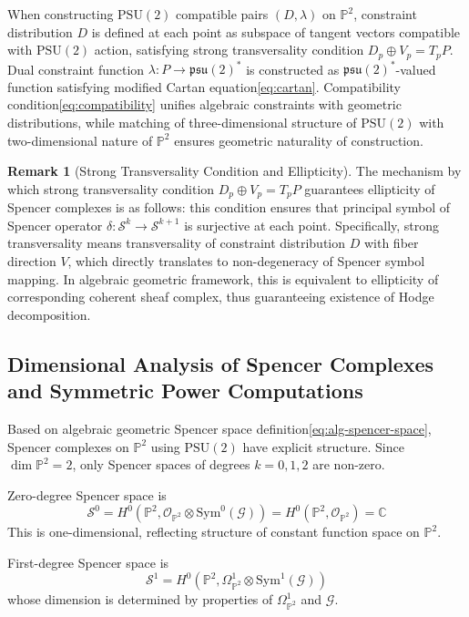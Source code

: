 \documentclass[a4paper,12pt]{extarticle}
\theoremstyle{definition}
\newtheorem{remark}{Remark}
\begin{document}
When constructing $\text{PSU}(2)$ compatible pairs $(D,\lambda)$ on $\mathbb{P}^2$, constraint distribution $D$ is defined at each point as subspace of tangent vectors compatible with $\text{PSU}(2)$ action, satisfying strong transversality condition $D_p \oplus V_p = T_pP$. Dual constraint function $\lambda: P \to \mathfrak{psu}(2)^*$ is constructed as $\mathfrak{psu}(2)^*$-valued function satisfying modified Cartan equation\eqref{eq:cartan}. Compatibility condition\eqref{eq:compatibility} unifies algebraic constraints with geometric distributions, while matching of three-dimensional structure of $\text{PSU}(2)$ with two-dimensional nature of $\mathbb{P}^2$ ensures geometric naturality of construction.

\begin{remark}[Strong Transversality Condition and Ellipticity]
The mechanism by which strong transversality condition $D_p \oplus V_p = T_pP$ guarantees ellipticity of Spencer complexes is as follows: this condition ensures that principal symbol of Spencer operator $\delta: \mathcal{S}^k \to \mathcal{S}^{k+1}$ is surjective at each point. Specifically, strong transversality means transversality of constraint distribution $D$ with fiber direction $V$, which directly translates to non-degeneracy of Spencer symbol mapping. In algebraic geometric framework, this is equivalent to ellipticity of corresponding coherent sheaf complex, thus guaranteeing existence of Hodge decomposition.
\end{remark}

\subsection{Dimensional Analysis of Spencer Complexes and Symmetric Power Computations}

Based on algebraic geometric Spencer space definition\eqref{eq:alg-spencer-space}, Spencer complexes on $\mathbb{P}^2$ using $\text{PSU}(2)$ have explicit structure. Since $\dim \mathbb{P}^2 = 2$, only Spencer spaces of degrees $k = 0, 1, 2$ are non-zero.

Zero-degree Spencer space is
$$\mathcal{S}^0 = H^0(\mathbb{P}^2, \mathcal{O}_{\mathbb{P}^2} \otimes \mathrm{Sym}^0(\mathcal{G})) = H^0(\mathbb{P}^2, \mathcal{O}_{\mathbb{P}^2}) = \mathbb{C}$$
This is one-dimensional, reflecting structure of constant function space on $\mathbb{P}^2$.

First-degree Spencer space is
$$\mathcal{S}^1 = H^0(\mathbb{P}^2, \Omega^1_{\mathbb{P}^2} \otimes \mathrm{Sym}^1(\mathcal{G}))$$
whose dimension is determined by properties of $\Omega^1_{\mathbb{P}^2}$ and $\mathcal{G}$.
\end{document}
